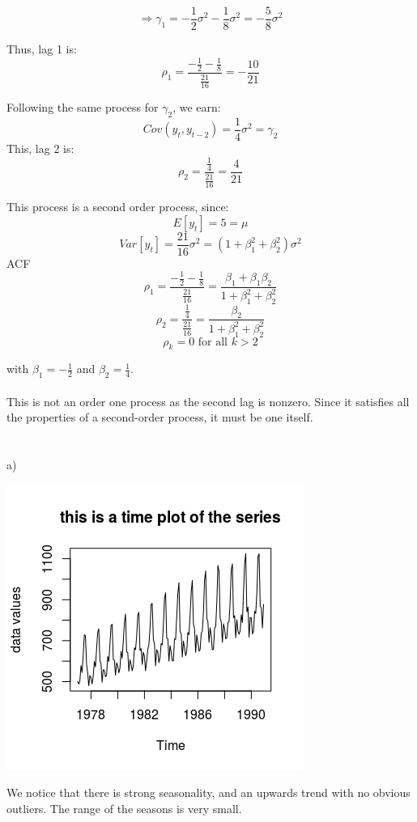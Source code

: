 \documentclass[11pt]{article}
\begin{document}
$$ \Rightarrow \gamma_1 = -\frac{1}{2}\sigma^2 - \frac{1}{8}\sigma^2 = -\frac{5}{8}\sigma^2$$

Thus, lag 1 is: 
$$ \rho_1 = \frac{-\frac{1}{2} - \frac{1}{8}}{\frac{21}{16}} = -\frac{10}{21} $$

Following the same process for $\gamma_2$, we earn:
$$ Cov(y_t, y_{t-2}) = \frac{1}{4}\sigma^2 = \gamma_2 $$
This, lag 2 is:
$$ \rho_2 = \frac{\frac{1}{4}}{\frac{21}{16}} = \frac{4}{21} $$

This process is a second order process, since:
$$ E[y_t] = 5 = \mu $$
$$ Var[y_t] = \frac{21}{16}\sigma^2 = (1 + \beta_1^2 + \beta_2^2) \sigma^2 $$
ACF
$$ \rho_1 = \frac{-\frac{1}{2} - \frac{1}{8}}{\frac{21}{16}} = \frac{\beta_1 + \beta_1 \beta_2}{1 + \beta_1^2 + \beta_2^2} $$
$$ \rho_2 = \frac{\frac{1}{4}}{\frac{21}{16}} = \frac{\beta_2}{1 + \beta_1^2 + \beta_2^2} $$
$$ \rho_k = 0 \text{ for all } k > 2$$

with $\beta_1 = -\frac{1}{2}$ and $\beta_2 = \frac{1}{4}$. \\\\
This is not an order one process as the second lag is nonzero. Since it satisfies all the properties of a second-order process, it must be one itself.

\newpage
\section{}
a)   
\begin{center}
	\includegraphics[scale=1]{plt4a}    
\end{center}

We notice that there is strong seasonality, and an upwards trend with no obvious outliers. The range of the seasons is very small.  
  
\end{document}

